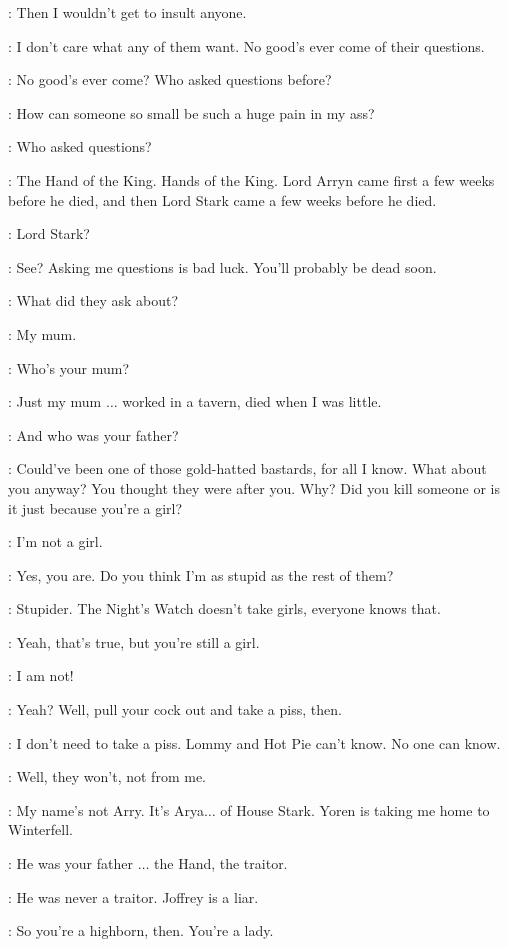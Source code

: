 \ARYA: Then I wouldn't get to insult anyone.

\GENDRY: I don't care what any of them want. No good's ever come of their questions.

\ARYA: No good's ever come? Who asked questions before?

\GENDRY: How can someone so small be such a huge pain in my ass?

\ARYA: Who asked questions?

\GENDRY: The Hand of the King. Hands of the King. Lord Arryn came first a few weeks before he died, and then Lord Stark came a few weeks before he died.

\ARYA: Lord Stark?

\GENDRY: See? Asking me questions is bad luck. You'll probably be dead soon.

\ARYA: What did they ask about?

\GENDRY: My mum.

\ARYA: Who's your mum?

\GENDRY: Just my mum $\ldots$ worked in a tavern, died when I was little.

\ARYA: And who was your father?

\GENDRY: Could've been one of those gold-hatted bastards, for all I know. What about you anyway? You thought they were after you. Why? Did you kill someone or is it just because you're a girl?

\ARYA: I'm not a girl.

\GENDRY: Yes, you are. Do you think I'm as stupid as the rest of them?

\ARYA: Stupider. The Night's Watch doesn't take girls, everyone knows that.

\GENDRY: Yeah, that's true, but you're still a girl.

\ARYA: I am not!

\GENDRY: Yeah? Well, pull your cock out and take a piss, then.

\ARYA: I don't need to take a piss. Lommy and Hot Pie can't know. No one can know.

\GENDRY: Well, they won't, not from me.

\ARYA: My name's not Arry. It's Arya$\ldots$ of House Stark. Yoren is taking me home to Winterfell.

\GENDRY: He was your father $\ldots$ the Hand, the traitor.

\ARYA: He was never a traitor. Joffrey is a liar.

\GENDRY: So you're a highborn, then. You're a lady.


